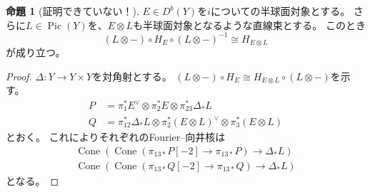 \documentclass[uplatex, a4paper, dvipdfmx]{jsarticle}
\theoremstyle{definition}
\newtheorem{proposition}[theorem]{命題}
\DeclareMathOperator{\Cone}{\mathrm{Cone}}
\DeclareMathOperator{\Pic}{\mathrm{Pic}}
\begin{document}
\begin{proposition}[証明できていない！]
    $E \in D^b(Y)$を$i$についての半球面対象とする。
    さらに$L \in \Pic(Y)$を、$E \otimes L$も半球面対象となるような直線束とする。
    このとき
    \begin{equation}
        (L \otimes -) \circ H_E \circ (L \otimes -)^{-1} \cong H_{E\otimes L}
    \end{equation}
    が成り立つ。
\end{proposition}
\begin{proof}
    $\Delta \colon Y \to Y \times Y$を対角射とする。
    $(L \otimes -) \circ H_E \cong H_{E\otimes L} \circ (L \otimes -)$を示す。
    \begin{align}
        P & = \pi_1^*E^\vee \otimes \pi_2^* E \otimes \pi_{23}^*\Delta_*L                         \\
        Q & = \pi_{12}^*\Delta_*L \otimes \pi_2^*(E \otimes L)^\vee \otimes \pi_3^* (E \otimes L)
    \end{align}
    とおく。
    これによりそれぞれのFourier--向井核は
    \begin{align}
        \Cone(\Cone(\pi_{13*}P[-2] \to \pi_{13*}P) \to \Delta_*L) \\
        \Cone(\Cone(\pi_{13*}Q[-2] \to \pi_{13*}Q) \to \Delta_*L)
    \end{align}
    となる。


\end{proof}
\end{document}
